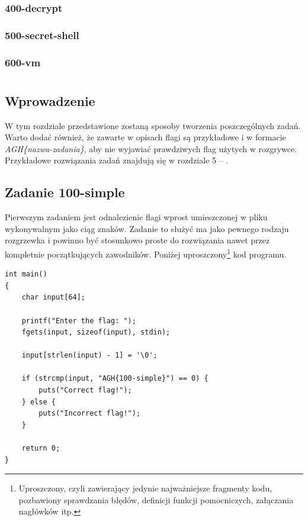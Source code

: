 \documentclass[polish,12pt]{aghthesis}
\begin{document}
\subsubsection{400-decrypt}
\subsubsection{500-secret-shell}
\subsubsection{600-vm}

\clearpage

\section{\SectionTitleRealizationAspects}
\label{sec:wybrane-aspekty-realizacji}

\subsection{Wprowadzenie}

W tym rozdziale przedstawione zostaną sposoby tworzenia poszczególnych zadań.
Warto dodać również, że zawarte w opisach flagi są przykładowe i w formacie
\emph{AGH\{nazwa-zadania\}}, aby nie wyjawiać prawdziwych flag użytych w rozgrywce.
Przykładowe rozwiązania zadań znajdują się w rozdziale 5 -- .

\subsection{Zadanie 100-simple}

Pierwszym zadaniem jest odnalezienie flagi wprost umieszczonej
w pliku wykonywalnym jako ciąg znaków.
Zadanie to służyć ma jako pewnego rodzaju rozgrzewka i powinno być stosunkowo
proste do rozwiązania nawet przez kompletnie początkujących zawodników.
Poniżej uproszczony\footnote{Uproszczony, czyli zawierający jedynie
najważniejsze fragmenty kodu, pozbawiony sprawdzania błędów, definicji funkcji
pomocniczych, załączania nagłówków itp.} kod programu.

\begin{verbatim}
int main()
{
    char input[64];

    printf("Enter the flag: ");
    fgets(input, sizeof(input), stdin);

    input[strlen(input) - 1] = '\0';

    if (strcmp(input, "AGH{100-simple}") == 0) {
        puts("Correct flag!");
    } else {
        puts("Incorrect flag!");
    }

    return 0;
}
\end{verbatim}
\end{document}
